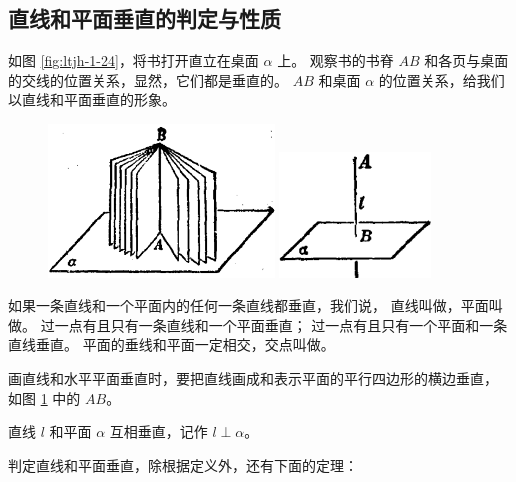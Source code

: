 \subsection{直线和平面垂直的判定与性质}\label{subsec:1-9}

如图 \ref{fig:ltjh-1-24}，将书打开直立在桌面 $\alpha$ 上。
观察书的书脊 $AB$ 和各页与桌面的交线的位置关系，显然，它们都是垂直的。
$AB$ 和桌面 $\alpha$ 的位置关系，给我们以直线和平面垂直的形象。

\begin{figure}[htbp]
    \centering
    \begin{minipage}[b]{7cm}
        \centering
        \includegraphics[width=6cm]{../pic/ltjh-ch1-24.png}
        \caption{}\label{fig:ltjh-1-24}
    \end{minipage}
    \qquad
    \begin{minipage}[b]{7cm}
        \centering
        \includegraphics[width=4cm]{../pic/ltjh-ch1-25.png}
        \caption{}\label{fig:ltjh-1-25}
    \end{minipage}
\end{figure}

如果一条直线和一个平面内的任何一条直线都垂直，我们说，
直线叫做，平面叫做。
过一点有且只有一条直线和一个平面垂直；
过一点有且只有一个平面和一条直线垂直。
平面的垂线和平面一定相交，交点叫做。

画直线和水平平面垂直时，要把直线画成和表示平面的平行四边形的横边垂直，
如图 \ref{fig:ltjh-1-25} 中的 $AB$。

直线 $l$ 和平面 $\alpha$ 互相垂直，记作 $l \perp \alpha$。

判定直线和平面垂直，除根据定义外，还有下面的定理：

